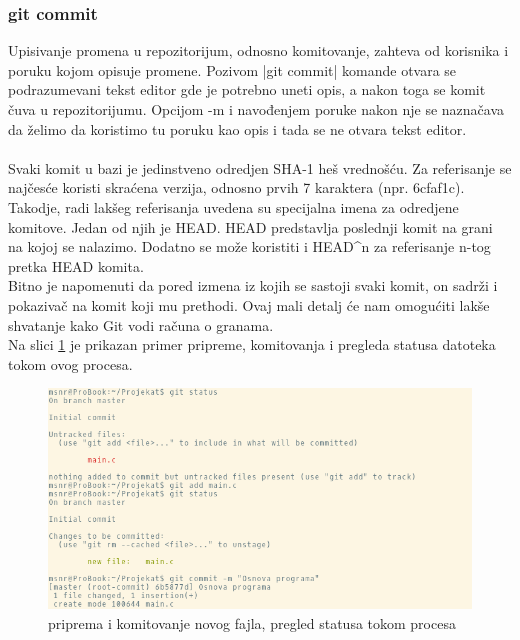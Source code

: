 \documentclass[a4paper]{article}
\begin{document}
{\subsubsection*{git commit}
\label{subsec:git_commit}
Upisivanje promena u repozitorijum, odnosno komitovanje, zahteva od korisnika i poruku kojom opisuje promene. Pozivom |git commit| komande otvara se podrazumevani tekst editor gde je potrebno uneti opis, a nakon toga se komit čuva u repozitorijumu. Opcijom -m i navođenjem poruke nakon nje se naznačava da želimo da koristimo tu poruku kao opis i tada se ne otvara tekst editor.
\\\\
Svaki komit u bazi je jedinstveno odredjen SHA-1 heš vrednošću. Za referisanje se najčesće koristi skraćena verzija, odnosno prvih 7 karaktera (npr. 6cfaf1c).
Takodje, radi lakšeg referisanja uvedena su specijalna imena za odredjene komitove. Jedan od njih je HEAD. HEAD predstavlja poslednji komit na grani na kojoj se nalazimo. Dodatno se može koristiti i HEAD\^{}n za referisanje n-tog pretka HEAD komita.\\
Bitno je napomenuti da pored izmena iz kojih se sastoji svaki komit, on sadrži i pokazivač na komit koji mu prethodi. Ovaj mali detalj će nam omogućiti lakše shvatanje kako Git vodi računa o granama.\\
Na slici \ref{fig:git_commit} je prikazan primer pripreme, komitovanja i pregleda statusa datoteka tokom ovog procesa.


\begin{figure}[h!]
\begin{center}
\includegraphics[scale=0.55]{images/commit.png}
\end{center}
\caption{priprema i komitovanje novog fajla, pregled statusa tokom procesa}
\label{fig:git_commit}
\end{figure}

}
\end{document}
